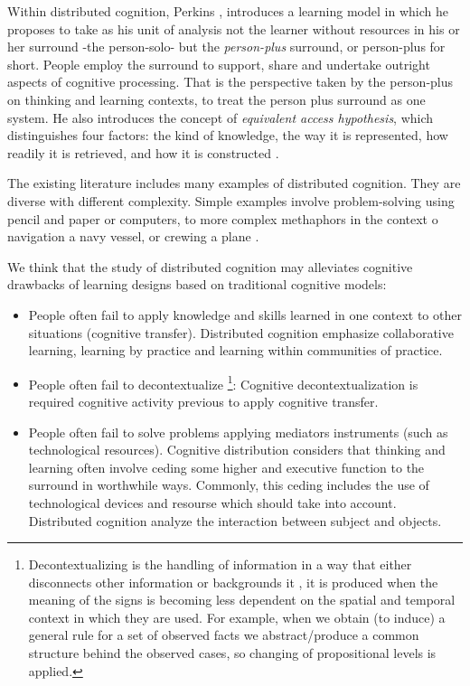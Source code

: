 \documentclass[10pt,twocolumn,ieeetran]{article}
\begin{document}

Within distributed cognition, Perkins \cite{Perkins}, \cite{Perkins2} introduces a learning model in which he proposes to take as his unit of analysis not the learner without resources in his or her surround -the person-solo- but the {\it person-plus} surround, or person-plus for short. People employ the surround to support, share and undertake outright aspects of cognitive processing. That is the perspective taken by the person-plus on thinking and learning contexts, to treat the person plus surround as one system.
He also introduces the concept of {\it equivalent access hypothesis}, which distinguishes four factors: the kind of knowledge, the way it is represented, how readily it is retrieved, and how it is constructed \cite{Salomon}.

The existing literature includes many examples of distributed cognition. They are diverse with different complexity. Simple examples involve problem-solving using pencil and paper or computers, to more complex methaphors in the context o navigation a navy vessel, or crewing a plane \cite{Hutchins95}. 


We think that the study of distributed cognition may alleviates cognitive drawbacks of learning designs based on traditional cognitive models: 

\begin{itemize}

\item People often fail to apply knowledge and skills learned in one context to other situations \cite{Perkins} (cognitive transfer). Distributed cognition emphasize collaborative learning, learning by practice and learning within communities of practice.

\item People often fail to decontextualize \footnote{Decontextualizing \cite{Wertsch} is the handling of information in a way that either disconnects other information or backgrounds it \cite{Denny}, it is produced when the meaning of the signs is becoming less dependent on the spatial and temporal context in which they are used. For example, when we obtain (to induce) a general rule for a set of observed facts we abstract/produce a common structure behind the observed cases, so changing of propositional levels is applied.}: Cognitive decontextualization is required cognitive activity previous to apply cognitive transfer.  

\item People often fail to solve problems applying mediators instruments (such as technological resources).
Cognitive distribution considers that thinking and learning often involve ceding some higher and executive function to the surround in worthwhile ways. Commonly, this ceding includes the use of technological devices and resourse which should take into account. Distributed cognition analyze the interaction between subject and objects.   
\end{itemize}
\end{document}

